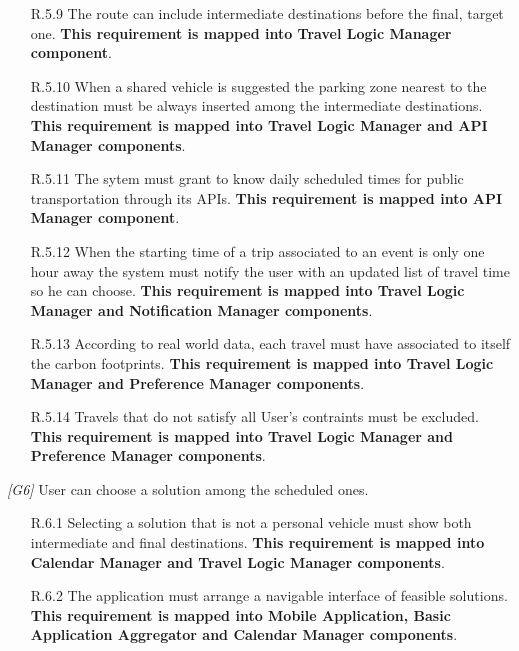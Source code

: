 \begin{description}
\begin{itemize}
			\item [R.5.9] The route can include intermediate destinations before the final, target one.
			\textbf{This requirement is mapped into Travel Logic Manager component}.

			\item [R.5.10] When a shared vehicle is suggested the parking zone nearest to the destination must be always inserted among the intermediate destinations.
			\textbf{This requirement is mapped into Travel Logic Manager and API Manager components}.

			\item [R.5.11] The sytem must grant to know daily scheduled times for public transportation through its APIs.
			\textbf{This requirement is mapped into API Manager component}.

			\item [R.5.12] When the starting time of a trip associated to an event is only one hour away the system must notify the user with an updated list of travel time so he can choose.
			\textbf{This requirement is mapped into Travel Logic Manager and Notification Manager components}.

			\item [R.5.13] According to real world data, each travel must have associated to itself the carbon footprints.
			\textbf{This requirement is mapped into Travel Logic Manager and Preference Manager components}.

			\item [R.5.14] Travels that do not satisfy all User's contraints must be excluded.			
			\textbf{This requirement is mapped into Travel Logic Manager and Preference Manager components}.
		\end{itemize}
		

	\item \textit{[G6]} User can choose a solution among the scheduled ones. 
		\begin{itemize}
			\item [R.6.1] Selecting a solution that is not a personal vehicle must show both intermediate and final destinations.
			\textbf{This requirement is mapped into Calendar Manager and Travel Logic Manager components}.

			\item [R.6.2] The application must arrange a navigable interface of feasible solutions.
			\textbf{This requirement is mapped into Mobile Application, Basic Application Aggregator and Calendar Manager components}.


\end{itemize}
\end{description}
